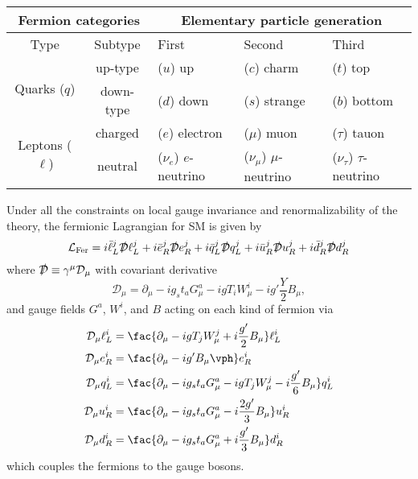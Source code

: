 \begin{center}
	{\small
	\begin{tabular}{|c||c||l|l|l|}
		\hline \multicolumn{2}{|c||}{ \textbf{Fermion categories} } & \multicolumn{3}{c|}{\textbf{ Elementary particle generation} } \bigstrut\\
		\hline \hline Type & Subtype & First & Second & Third \bigstrut\\
		\hline\hline \multirow{2}{*}{ Quarks ($q$) }  & up-type & ($u$) up & ($c$) charm & ($t$) top  \bigstrut \\
		\cline { 2 - 5 }  & down-type & ($d$) down & ($s$) strange & ($b$) bottom  \bigstrut\\
		\hline\hline \multirow{2}{*}{ Leptons ($\ell$) } & charged & ($e$) electron & ($\mu$) muon & ($\tau$) tauon \bigstrut\\
		\cline { 2 - 5 } & neutral & ($\nu_e$) $e$-neutrino & ($\nu_\mu$) $\mu$-neutrino & ($\nu_\tau$) $\tau$-neutrino \bigstrut\\
		\hline
	\end{tabular}
	}
	\label{tab-generations}
\end{center}

Under all the constraints on local gauge invariance and renormalizability of the theory, the fermionic Lagrangian for SM is given by
\begin{equation}
	\mathcal{L}_{\mathrm{Fer}}
	=i \bar{\ell}_{L}^j \slashed{\mathcal D} \ell_{L}^j
	+i \bar{e}_{R}^j \slashed{\mathcal D} e_{R}^j
	+i{\bar{q}}_{L}^j  \slashed{\mathcal D}  q_{L}^j
	+i{\bar{u}}_{R}^j  \slashed{\mathcal D}  u_{R}^j
	+i{\bar{d}}_{R}^j  \slashed{\mathcal D}  d_{R}^j
\end{equation}
where $\slashed{\mathcal D}\equiv \gamma ^\mu \mathcal D_\mu$ with covariant derivative
\begin{equation}
	\mathcal D_\mu = \partial_\mu -ig_st_ aG^a_\mu -ig T_i W_\mu^i -ig'\frac Y2 B_\mu,
\end{equation}
and gauge fields $G^a$, $W^i$, and $B$ acting on each kind of fermion via
\begin{equation}
\begin{aligned}
	\mathcal D_{ \mu} \ell_L^i &=\fac{\partial_{\mu}-i g T_j W_{\mu}^{j}+i \frac{g^{\prime}}2 B_{\mu}} \ell_L^i \\
	\mathcal D_{ \mu} e_R^i &=\fac{\partial_{\mu} -  i g^{\prime}  B_{\mu}\vph}e_R^i \\
	\mathcal D_{ \mu} q_L^i &=\fac{\partial_{\mu}-i g_{s} t_{a} G_{\mu}^{a}-i g T_j W_{\mu}^{j}-i \frac{g^{\prime}}{6} B_{\mu}} q_L^i \\
	\mathcal D_{ \mu} u_R^i &=\fac{\partial_{\mu} -i g_{s} t_{a} G_{\mu}^{a} - i \frac{2g^{\prime}}3  B_{\mu}}u_R^i \\
	\mathcal D_{ \mu} d_R^i &=\fac{\partial_{\mu} -i g_{s} t_{a} G_{\mu}^{a} + i \frac{g^{\prime}}3  B_{\mu}}d_R^i \\
\end{aligned}
\end{equation}
which couples the fermions to the gauge bosons. 

